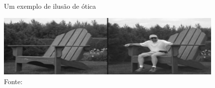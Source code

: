 \begin{figure}[h!]
    \centering
    \caption{Um exemplo de ilusão de ótica}
    \includegraphics[width=.9\textwidth]{fig/ambiguity.png}
    \caption*{Fonte: }
    \label{fig:ambiguity}
\end{figure}

